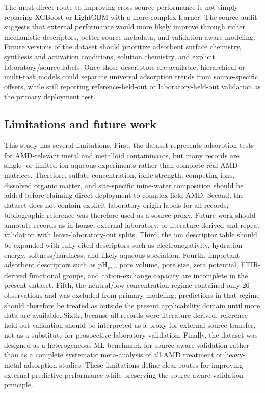\documentclass[review,12pt,number]{elsarticle}
\begin{document}
The most direct route to improving cross-source performance is not simply replacing XGBoost or LightGBM with a more complex learner. The source audit suggests that external performance would more likely improve through richer mechanistic descriptors, better source metadata, and validation-aware modeling. Future versions of the dataset should prioritize adsorbent surface chemistry, synthesis and activation conditions, solution chemistry, and explicit laboratory/source labels. Once those descriptors are available, hierarchical or multi-task models could separate universal adsorption trends from source-specific offsets, while still reporting reference-held-out or laboratory-held-out validation as the primary deployment test.

\subsection{Limitations and future work}

This study has several limitations. First, the dataset represents adsorption tests for AMD-relevant metal and metalloid contaminants, but many records are single- or limited-ion aqueous experiments rather than complete real AMD matrices. Therefore, sulfate concentration, ionic strength, competing ions, dissolved organic matter, and site-specific mine-water composition should be added before claiming direct deployment to complex field AMD. Second, the dataset does not contain explicit laboratory-origin labels for all records; bibliographic reference was therefore used as a source proxy. Future work should annotate records as in-house, external-laboratory, or literature-derived and repeat validation with leave-laboratory-out splits. Third, the ion descriptor table should be expanded with fully cited descriptors such as electronegativity, hydration energy, softness/hardness, and likely aqueous speciation. Fourth, important adsorbent descriptors such as pH$_\mathrm{pzc}$, pore volume, pore size, zeta potential, FTIR-derived functional groups, and cation-exchange capacity are incomplete in the present dataset. Fifth, the neutral/low-concentration regime contained only 26 observations and was excluded from primary modeling; predictions in that regime should therefore be treated as outside the present applicability domain until more data are available. Sixth, because all records were literature-derived, reference-held-out validation should be interpreted as a proxy for external-source transfer, not as a substitute for prospective laboratory validation. Finally, the dataset was designed as a heterogeneous ML benchmark for source-aware validation rather than as a complete systematic meta-analysis of all AMD treatment or heavy-metal adsorption studies. These limitations define clear routes for improving external predictive performance while preserving the source-aware validation principle.
\end{document}
